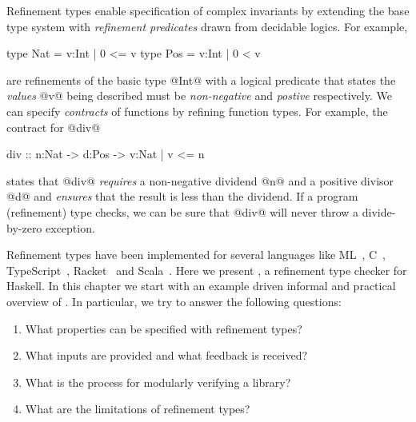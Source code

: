 Refinement types enable specification of complex invariants 
by extending the base type system with \emph{refinement predicates} 
drawn from decidable logics. For example,
%
\begin{code}
  type Nat = {v:Int | 0 <= v}
  type Pos = {v:Int | 0 < v}
\end{code}
%
are refinements of the basic type @Int@ with a logical predicate 
that states the \emph{values} @v@ being described must be 
\emph{non-negative} and \emph{postive} respectively. 
%
We can specify \emph{contracts} of functions by refining function types. 
For example, the contract for @div@
%
\begin{code}
  div :: n:Nat -> d:Pos -> {v:Nat | v <= n}
\end{code}
%
states that @div@ \emph{requires} a non-negative dividend @n@ and a positive
divisor @d@ and \emph{ensures} that the result is less than the dividend.
%
If a program (refinement) type checks, we can be sure that @div@ will never 
throw a divide-by-zero exception.

Refinement types \citep{ConstableS87,Rushby98} 
have been implemented for several languages like
ML~\cite{pfenningxi98,GordonTOPLAS2011,LiquidPLDI08},
C~\cite{deputy,LiquidPOPL10},
TypeScript~\cite{Vekris16},
Racket~\cite{RefinedRacket} and Scala~\cite{refinedscala}.
%
Here we present \toolname,
a refinement type checker for Haskell.
%
In this chapter we start with an example driven informal and practical overview
of \toolname.
%
In particular, we try to answer the following questions:
%
\begin{enumerate}
  \item What properties can be specified with refinement types?
  \item What inputs are provided and what feedback is received?
  \item What is the process for modularly verifying a library?
  \item What are the limitations of refinement types? 
\end{enumerate}


